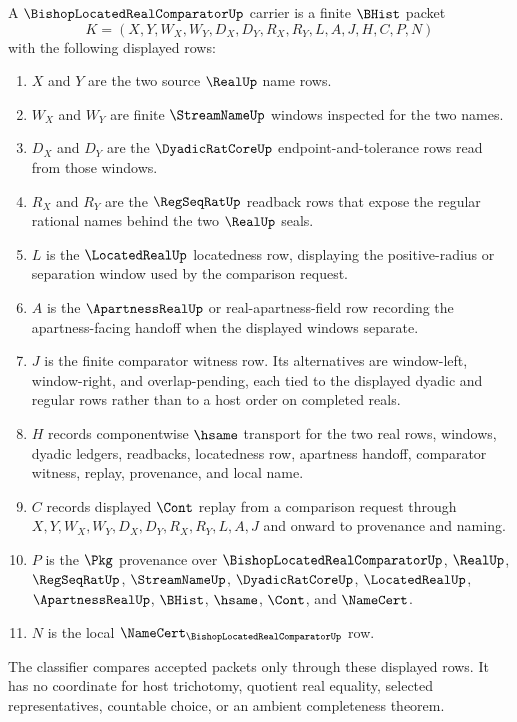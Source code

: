 \begin{definition}
\label{def:bishop-located-real-comparator-carrier}
A $\BishopLocatedRealComparatorUp$ carrier is a finite $\BHist$ packet
$$
K=(X,Y,W_X,W_Y,D_X,D_Y,R_X,R_Y,L,A,J,H,C,P,N)
$$
with the following displayed rows:
\begin{enumerate}
\item $X$ and $Y$ are the two source $\RealUp$ name rows.
\item $W_X$ and $W_Y$ are finite $\StreamNameUp$ windows inspected for the two names.
\item $D_X$ and $D_Y$ are the $\DyadicRatCoreUp$ endpoint-and-tolerance rows read from those windows.
\item $R_X$ and $R_Y$ are the $\RegSeqRatUp$ readback rows that expose the regular rational names behind the two $\RealUp$ seals.
\item $L$ is the $\LocatedRealUp$ locatedness row, displaying the positive-radius or separation window used by the comparison request.
\item $A$ is the $\ApartnessRealUp$ or real-apartness-field row recording the apartness-facing handoff when the displayed windows separate.
\item $J$ is the finite comparator witness row. Its alternatives are window-left, window-right, and overlap-pending, each tied to the displayed dyadic and regular rows rather than to a host order on completed reals.
\item $H$ records componentwise $\hsame$ transport for the two real rows, windows, dyadic ledgers, readbacks, locatedness row, apartness handoff, comparator witness, replay, provenance, and local name.
\item $C$ records displayed $\Cont$ replay from a comparison request through $X,Y,W_X,W_Y,D_X,D_Y,R_X,R_Y,L,A,J$ and onward to provenance and naming.
\item $P$ is the $\Pkg$ provenance over $\BishopLocatedRealComparatorUp$, $\RealUp$, $\RegSeqRatUp$, $\StreamNameUp$, $\DyadicRatCoreUp$, $\LocatedRealUp$, $\ApartnessRealUp$, $\BHist$, $\hsame$, $\Cont$, and $\NameCert$.
\item $N$ is the local $\NameCert_{\BishopLocatedRealComparatorUp}$ row.
\end{enumerate}
The classifier compares accepted packets only through these displayed rows. It has no coordinate for host trichotomy, quotient real equality, selected representatives, countable choice, or an ambient completeness theorem.
\end{definition}

